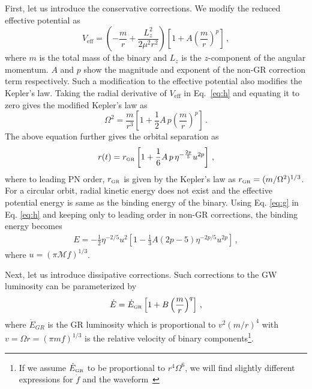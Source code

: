 \documentclass[prd,twocolumn,nofootinbib]{revtex4-1}
\newcommand{\GR}{{\mbox{\tiny GR}}}
\begin{document}
First, let us introduce the conservative corrections. We modify the reduced effective potential as
 \begin{equation}\label{eq:h}
 V_{\text{eff}}=\left(-\frac{m}{r}+\frac{{L}^2_{z}}{2\mu^2r^2}\right)\left[1+A \left(\frac{m}{r}\right)^p\right]\,,
 \end{equation}
where $m$ is the total mass of the binary and $L_{z}$ is the $z$-component of the angular momentum. $A$ and $p$ show the magnitude and exponent of the non-GR correction term respectively. Such a modification to the effective potential also modifies the Kepler's law. Taking the radial derivative of $V_{\text{eff}}$ in Eq.~\eqref{eq:h} and equating it to zero gives the modified Kepler's law as
 \begin{equation}
 \Omega^2=\frac{m}{r^3} \left[1+\frac{1}{2} A \, p\left(\frac{m}{r}\right)^p\right]\,.
 \end{equation}
 The above equation further gives the orbital separation as
 \begin{equation}\label{eq:g}
 r(t)=r_{\GR}\left[1+\frac{1}{6}A\, p\, \eta^{-\frac{2p}{5}}u^{2p}\right]\,,
 \end{equation}
where to leading PN order, $r_{\GR}$ is given by the Kepler's law as $r_{\GR}=(m/\Omega^2)^{1/3}$. For a circular orbit, radial kinetic energy does not exist and the effective potential energy is same as the binding energy of the binary. Using Eq. \eqref{eq:g} in Eq. \eqref{eq:h} and keeping only to leading order in non-GR corrections, the binding energy becomes
\begin{align}\label{eq:j}
E=-\frac{1}{2}\eta^{-2/5}u^2\left[1-\frac{1}{3}A(2p-5)\eta^{-2p/5}u^{2p}\right]\,,
\end{align}
where $u=(\pi \mathcal{M} f)^{1/3}$.

Next, let us introduce dissipative corrections. Such corrections to the GW luminosity can be parameterized by
 \begin{equation}\label{eq:a}
 \dot{E}=\dot{E}_{\GR}\left[1+B\left(\frac{m}{r}\right)^q\right]\,,
 \end{equation}
 where $\dot{E}_{GR}$ is the GR luminosity which is proportional to $v^2(m/r)^4$ with $v=\Omega r = (\pi m f)^{1/3}$ is the relative velocity of binary components\footnote{If we assume $\dot{E}_{\GR}$ to be proportional to $r^4\Omega^6$, we will find slightly different expressions for $\dot{f}$ and the waveform~\cite{Chatziioannou:2012rf}}. 
 
\end{document}
